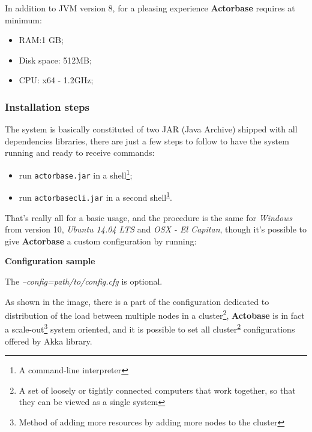 \documentclass{scalatekids-article}
\begin{document}
In addition to JVM version 8, for a pleasing experience \textbf{Actorbase} requires at minimum:
\begin{itemize}
\item RAM:\@1 GB;\@
\item Disk space: 512MB;\@
\item CPU: x64 - 1.2GHz;
\end{itemize}

\subsubsection{Installation steps}

The system is basically constituted of two JAR (Java Archive) shipped with all
dependencies libraries, there are just a few steps to follow to have the system
running and ready to receive commands:
\begin{itemize}
\item run \verb=actorbase.jar= in a shell\footnote{A command-line interpreter\label{shell}};
\item run \verb=actorbasecli.jar= in a second shell\textsuperscript{\ref{shell}}.
\end{itemize}
That's really all for a basic usage, and the procedure is the same for
\textit{Windows} from version 10, \textit{Ubuntu 14.04 LTS} and \textit{OSX - El
  Capitan}, though it's possible to give \textbf{Actorbase} a custom configuration by
running:


\textbf{Configuration sample}


The \textit{--config=path/to/config.cfg} is optional.

As shown in the image, there is a part of the configuration dedicated to
distribution of the load between multiple nodes in a cluster\footnote{A set of
loosely or tightly connected computers that work together, so that they can be
viewed as a single system\label{cluster}}, \textbf{Actobase} is in fact a
scale-out\footnote{Method of adding more resources by adding more nodes to the
cluster\label{cleout}} system oriented, and it is possible to set all
cluster\textsuperscript{\ref{cluster}} configurations offered by Akka library.
\end{document}
